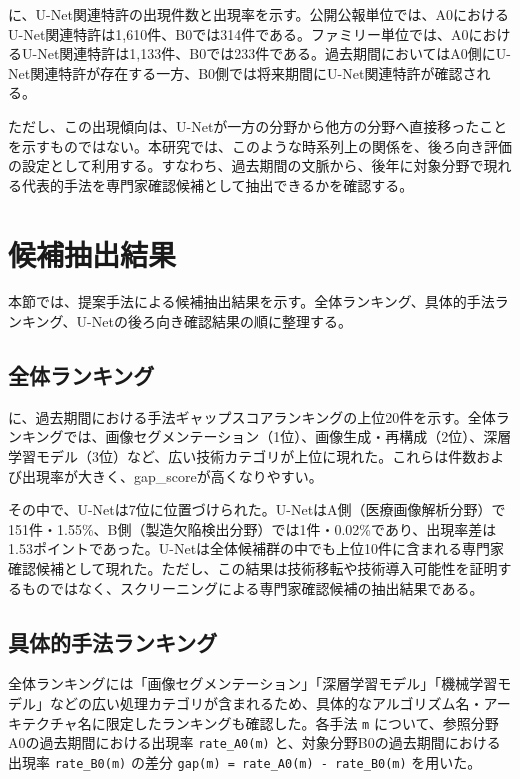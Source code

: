 に、U-Net関連特許の出現件数と出現率を示す。公開公報単位では、A0におけるU-Net関連特許は1,610件、B0では314件である。ファミリー単位では、A0におけるU-Net関連特許は1,133件、B0では233件である。過去期間においてはA0側にU-Net関連特許が存在する一方、B0側では将来期間にU-Net関連特許が確認される。

ただし、この出現傾向は、U-Netが一方の分野から他方の分野へ直接移ったことを示すものではない。本研究では、このような時系列上の関係を、後ろ向き評価の設定として利用する。すなわち、過去期間の文脈から、後年に対象分野で現れる代表的手法を専門家確認候補として抽出できるかを確認する。

\section{候補抽出結果}

本節では、提案手法による候補抽出結果を示す。全体ランキング、具体的手法ランキング、U-Netの後ろ向き確認結果の順に整理する。

\subsection{全体ランキング}


に、過去期間における手法ギャップスコアランキングの上位20件を示す。全体ランキングでは、画像セグメンテーション（1位）、画像生成・再構成（2位）、深層学習モデル（3位）など、広い技術カテゴリが上位に現れた。これらは件数および出現率が大きく、gap\_scoreが高くなりやすい。

その中で、U-Netは7位に位置づけられた。U-NetはA側（医療画像解析分野）で151件・1.55\%、B側（製造欠陥検出分野）では1件・0.02\%であり、出現率差は1.53ポイントであった。U-Netは全体候補群の中でも上位10件に含まれる専門家確認候補として現れた。ただし、この結果は技術移転や技術導入可能性を証明するものではなく、スクリーニングによる専門家確認候補の抽出結果である。

\subsection{具体的手法ランキング}


全体ランキングには「画像セグメンテーション」「深層学習モデル」「機械学習モデル」などの広い処理カテゴリが含まれるため、具体的なアルゴリズム名・アーキテクチャ名に限定したランキングも確認した。各手法 \texttt{m} について、参照分野A0の過去期間における出現率 \texttt{rate\_A0(m)} と、対象分野B0の過去期間における出現率 \texttt{rate\_B0(m)} の差分 \texttt{gap(m) = rate\_A0(m) - rate\_B0(m)} を用いた。

